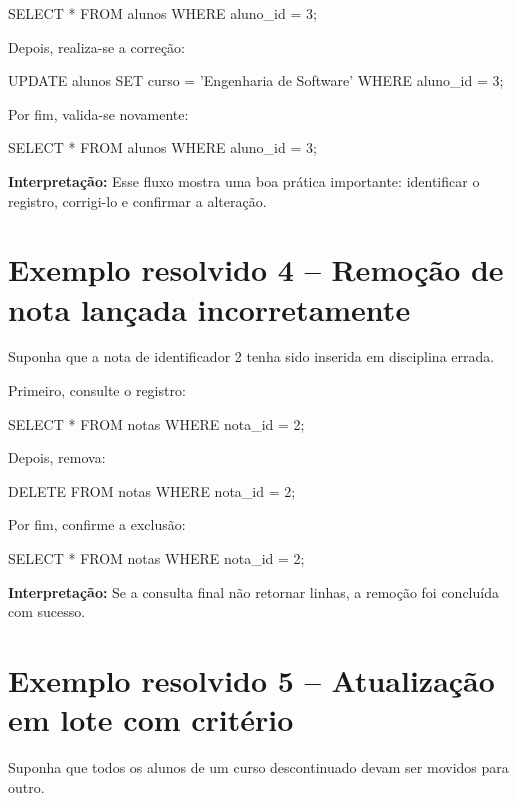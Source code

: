 \begin{sqlcode}
SELECT *
FROM alunos
WHERE aluno_id = 3;
\end{sqlcode}

Depois, realiza-se a correção:

\begin{sqlcode}
UPDATE alunos
SET curso = 'Engenharia de Software'
WHERE aluno_id = 3;
\end{sqlcode}

Por fim, valida-se novamente:

\begin{sqlcode}
SELECT *
FROM alunos
WHERE aluno_id = 3;
\end{sqlcode}

\textbf{Interpretação:}  
Esse fluxo mostra uma boa prática importante: identificar o registro, corrigi-lo e confirmar a alteração.

\section{Exemplo resolvido 4 -- Remoção de nota lançada incorretamente}

Suponha que a nota de identificador 2 tenha sido inserida em disciplina errada.

Primeiro, consulte o registro:

\begin{sqlcode}
SELECT *
FROM notas
WHERE nota_id = 2;
\end{sqlcode}

Depois, remova:

\begin{sqlcode}
DELETE FROM notas
WHERE nota_id = 2;
\end{sqlcode}

Por fim, confirme a exclusão:

\begin{sqlcode}
SELECT *
FROM notas
WHERE nota_id = 2;
\end{sqlcode}

\textbf{Interpretação:}  
Se a consulta final não retornar linhas, a remoção foi concluída com sucesso.

\section{Exemplo resolvido 5 -- Atualização em lote com critério}

Suponha que todos os alunos de um curso descontinuado devam ser movidos para outro.

